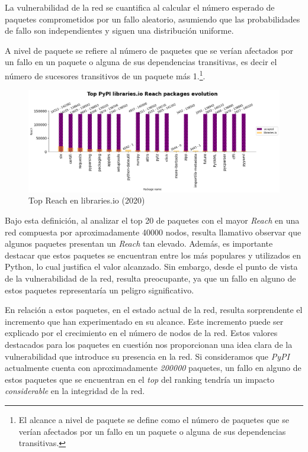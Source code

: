 La vulnerabilidad de la red se cuantifica al calcular el número esperado de paquetes comprometidos
por un fallo aleatorio, asumiendo que las probabilidades de fallo son independientes y siguen
una distribución uniforme.

A nivel de paquete se refiere al número de paquetes que se verían afectados por un fallo en un
paquete o alguna de sus dependencias transitivas, es decir el número de sucesores transitivos
de un paquete más 1.\footnote{El alcance a nivel de paquete se
    define como el número de paquetes que se verían afectados por un fallo en un paquete o alguna
    de sus dependencias transitivas.}.


\begin{figure}[h!]
    \begin{center}
        \includegraphics[width=1\textwidth]{img/pypi/top_librariesio_reach_evolution.png}
        \caption{Top Reach en libraries.io (2020)}
    \end{center}
\end{figure}


Bajo esta definición, al analizar el top 20 de paquetes con el mayor \textit{Reach} en una red compuesta por aproximadamente 40000 nodos, resulta llamativo observar que algunos paquetes
presentan un \textit{Reach} tan elevado. Además, es importante destacar que estos paquetes se
encuentran entre los más populares y utilizados en Python, lo cual justifica el valor alcanzado.
Sin embargo, desde el punto de vista de la vulnerabilidad de la red, resulta preocupante, ya que
un fallo en alguno de estos paquetes representaría un peligro significativo.

En relación a estos paquetes, en el estado actual de la red, resulta sorprendente el incremento
que han experimentado en su alcance. Este incremento puede ser explicado por el crecimiento en el
número de nodos de la red. Estos valores destacados para los paquetes en cuestión nos proporcionan
una idea clara de la vulnerabilidad que introduce su presencia en la red. Si consideramos que
\textit{PyPI} actualmente cuenta con aproximadamente \textit{200000} paquetes, un fallo en alguno de estos paquetes
que se encuentran en el \textit{top} del ranking tendría un impacto \textit{considerable} en la integridad de la red.


